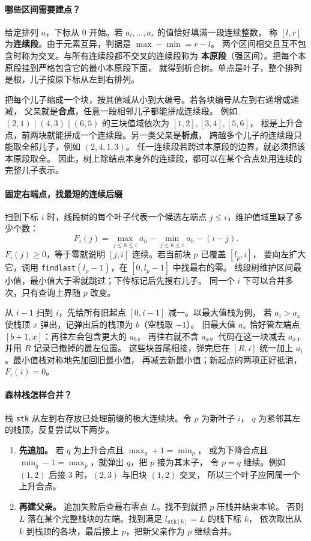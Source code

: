 \paragraph*{哪些区间需要建点？}
给定排列 $a$，下标从 $0$ 开始。若 $a_l,\ldots,a_r$ 的值恰好填满一段连续整数，
称 $[l,r]$ 为\textbf{连续段}。由于元素互异，判据是 $\max-\min=r-l$。
两个区间相交且互不包含时称为交叉。与所有连续段都不交叉的连续段称为
\textbf{本原段}（强区间）。把每个本原段挂到严格包含它的最小本原段下面，
就得到析合树。单点是叶子，整个排列是根，儿子按原下标从左到右排列。

把每个儿子缩成一个块，按其值域从小到大编号。若各块编号从左到右递增或递减，
父亲就是\textbf{合点}，任意一段相邻儿子都能拼成连续段。
例如 $(2,1)\mid(4,3)\mid(6,5)$ 的三块值域依次为 $[1,2],[3,4],[5,6]$，
根是上升合点，前两块就能拼成一个连续段。另一类父亲是\textbf{析点}，
跨越多个儿子的连续段只能取全部儿子，例如 $(2,4,1,3)$。
任一连续段若跨过本原段的边界，就必须把该本原段取全。
因此，树上除结点本身外的连续段，都可以在某个合点处用连续的完整儿子表示。

\paragraph*{固定右端点，找最短的连续后缀}
扫到下标 $i$ 时，线段树的每个叶子代表一个候选左端点 $j\le i$，维护值域里缺了多少个数：
\[
  F_i(j)=\max_{j\le h\le i} a_h-\min_{j\le h\le i} a_h-(i-j).
\]
$F_i(j)\ge 0$，等于零就说明 $[j,i]$ 连续。若当前块 $p$ 已覆盖 $[l_p,i]$，
要向左扩大它，调用 \texttt{findlast}$(l_p-1)$，在 $[0,l_p-1]$ 中找最右的零。
线段树维护区间最小值，最小值大于零就跳过；下传标记后先搜右儿子。
同一个 $i$ 下可以合并多次，只有查询上界随 $p$ 改变。

从 $i-1$ 扫到 $i$，先给所有旧起点 $[0,i-1]$ 减一。以最大值栈为例，
若 $a_i>a_x$ 使栈顶 $x$ 弹出，记弹出后的栈顶为 $b$（空栈取 $-1$）。
旧最大值 $a_x$ 恰好管左端点 $[b+1,x]$：再往左会包含更大的 $a_b$，
再往右就不含 $a_x$。代码在这一块减去 $a_x$，并用 $R$ 记录已撤掉的最左位置。
这些块首尾相接，弹完后在 $[R,i]$ 统一加上 $a_i$。最小值栈对称地先加回旧最小值，
再减去新最小值；新起点的两项正好抵消，$F_i(i)=0$。

\paragraph*{森林栈怎样合并？}
栈 \texttt{stk} 从左到右存放已处理前缀的极大连续块。令 $p$ 为新叶子 $i$，
$q$ 为紧邻其左的栈顶，反复尝试以下两步。

\begin{enumerate}
  \item \textbf{先追加。} 若 $q$ 为上升合点且 $\max_q+1=\min_p$，
        或为下降合点且 $\min_q-1=\max_p$，就弹出 $q$，把 $p$ 接为其末子，
        令 $p=q$ 继续。例如 $(1,2)$ 后接 $3$ 时，$(2,3)$ 与旧块 $(1,2)$ 交叉，
        所以三个叶子应同属一个上升合点。
  \item \textbf{再建父亲。} 追加失败后查最右零点 $L$。找不到就把 $p$ 压栈并结束本轮。
        否则 $L$ 落在某个完整栈块的左端。找到满足 $l_{\texttt{stk}[k]}=L$ 的栈下标 $k$，
        依次取出从 $k$ 到栈顶的各块，最后接上 $p$，把新父亲作为 $p$ 继续合并。
\end{enumerate}

